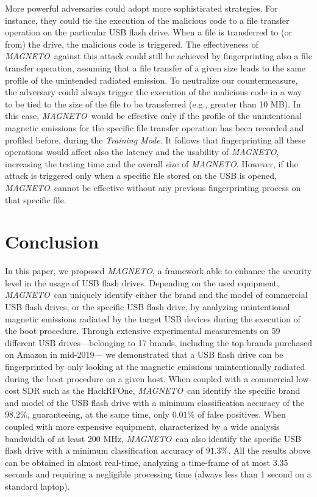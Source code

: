 \documentclass[acmsmall, authorversion]{acmart}
\newcommand{\sol}{\emph{MAGNETO}}
\begin{document}
\noindent
More powerful adversaries could adopt more sophisticated strategies. For instance, they could tie the execution of the malicious code to a file transfer operation on the particular USB flash drive. When a file is transferred to (or from) the drive, the malicious code is triggered. The effectiveness of \sol\ against this attack could still be achieved by fingerprinting also a file transfer operation, assuming that a file transfer of a given size leads to the same profile of the unintended radiated emission. To neutralize our countermeasure, the adversary could always trigger the execution of the malicious code in a way to be tied to the size of the file to be transferred (e.g., greater than 10 MB). In this case, \sol\ would be effective only if the profile of the unintentional magnetic emissions for the specific file transfer operation has been recorded and profiled before, during the \emph{Training Mode}. It follows that fingerprinting all these operations would affect also the latency and the usability of \sol, increasing the testing time and the overall size of \sol. 
However, if the attack is triggered only when a specific file stored on the USB is opened, \sol\ cannot be effective without any previous fingerprinting process on that specific file.

\section{Conclusion}
\label{sec:conclusion}

In this paper, we proposed \sol, a framework able to enhance the security level in the usage of USB flash drives. Depending on the used equipment, \sol\ can uniquely identify either the brand and the model of commercial USB flash drives, or the specific USB flash drive, by analyzing unintentional magnetic emissions radiated by the target USB devices during the execution of the boot procedure. %
Through extensive experimental measurements on 59 different USB drives---belonging to 17 brands, including the top brands purchased on Amazon in mid-2019--- we demonstrated that a USB flash drive can be fingerprinted by only looking at the magnetic emissions unintentionally radiated during the boot procedure on a given host. 
When coupled with a commercial low-cost \acl{SDR} such as the HackRFOne, \sol\ can identify the specific brand and model of the USB flash drive with a minimum classification accuracy of the $98.2$\%, guaranteeing, at the same time, only $0.01$\% of false positives. When coupled with more expensive equipment, characterized by a wide analysis bandwidth of at least 200 MHz, \sol\ can also identify the specific USB flash drive with a minimum classification accuracy of $91.3$\%. All the results above can be obtained in almost real-time, analyzing a time-frame of at most $3.35$ seconds and requiring a negligible processing time (always less than 1 second on a standard laptop).
\end{document}
